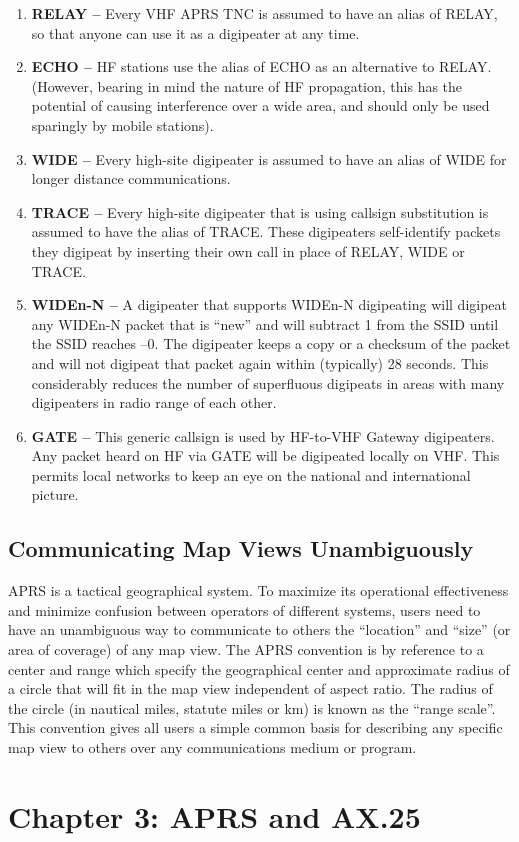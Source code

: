 \documentclass{scrreprt}[letter]
\begin{document}
\begin{enumerate}

\item \textbf{RELAY --} Every VHF APRS TNC is assumed to have an alias of
RELAY, so that anyone can use it as a digipeater at any time.

\item \textbf{ECHO --} HF stations use the alias of ECHO as an alternative to
RELAY. (However, bearing in mind the nature of HF propagation, this
has the potential of causing interference over a wide area, and should
only be used sparingly by mobile stations).

\item \textbf{WIDE --} Every high-site digipeater is assumed to have an alias of WIDE
for longer distance communications.

\item \textbf{TRACE --} Every high-site digipeater that is using callsign substitution
is assumed to have the alias of TRACE. These digipeaters self-identify
packets they digipeat by inserting their own call in place of RELAY,
WIDE or TRACE.

\item \textbf{WIDEn-N --} A digipeater that supports WIDEn-N digipeating will
digipeat any WIDEn-N packet that is “new” and will subtract 1 from the
SSID until the SSID reaches –0. The digipeater keeps a copy or a
checksum of the packet and will not digipeat that packet again within
(typically) 28 seconds. This considerably reduces the number of
superfluous digipeats in areas with many digipeaters in radio range of
each other.

\item \textbf{GATE --} This generic callsign is used by HF-to-VHF Gateway
digipeaters. Any packet heard on HF via GATE will be digipeated locally
on VHF. This permits local networks to keep an eye on the national and
international picture.

\end{enumerate}

\section{Communicating Map Views Unambiguously}

APRS is a tactical geographical system. To maximize its operational
effectiveness and minimize confusion between operators of different
systems, users need to have an unambiguous way to communicate to others
the “location” and “size” (or area of coverage) of any map view.
The APRS convention is by reference to a center and range which specify
the geographical center and approximate radius of a circle that will fit in the
map view independent of aspect ratio. The radius of the circle (in nautical
miles, statute miles or km) is known as the “range scale”. This convention
gives all users a simple common basis for describing any specific map view
to others over any communications medium or program.


\chapter{Chapter 3: APRS and AX.25}
\end{document}

